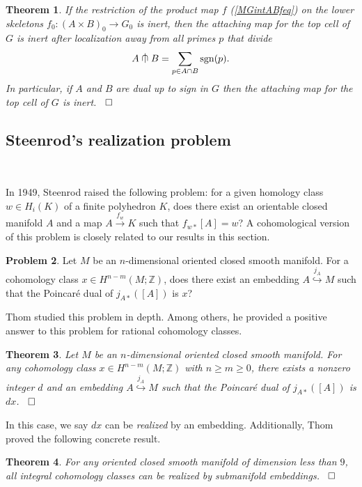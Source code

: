 \documentclass[a4]{amsart}
\newtheorem{theorem}{Theorem}[section]
\theoremstyle{definition}
\newtheorem{problem}[theorem]{Problem}
\newcommand{\testcap}{\mathrel{\vcenter{\offinterlineskip
\hbox{$\cap$}\vskip-1.8ex\hbox{$\kern0.2em | \kern0.15em$}}}}
\newcommand{\qqed}{\hfill\Box}
\begin{document}
\begin{sloppypar}
\begin{theorem}
If the restriction of the product map $f$ (\ref{MGintABfeq}) on the lower skeletons 
$
f_0: (A\times B)_0\stackrel{}{\longrightarrow} G_0
$ 
is inert, 
then the attaching map for the top cell of $G$ is inert after localization away from all primes $p$ that divide 
\[
A\testcap B=\sum\limits_{p\in A\cap B} {\rm sgn}(p).
\]
In particular, if $A$ and $B$ are dual up to sign in $G$ then the attaching map for the top cell of $G$ is inert.  ~$\qqed$
\end{theorem}
 

\subsection{Steenrod's realization problem}
\label{subsec: steenq}

$\, $

In 1949, Steenrod \cite{Eil49} raised the following problem: for a given homology class $w\in H_i(K)$ of a finite polyhedron $K$, does there exist an orientable closed manifold $A$ and a map $A\stackrel{f_w}{\longrightarrow} K$ such that $f_{w\ast}[A]=w$? A cohomological version of this problem is closely related to our results in this section. 
\begin{problem}\label{steenq}
Let $M$ be an $n$-dimensional oriented closed smooth manifold. For a cohomology class $x\in H^{n-m}(M;\mathbb{Z})$, does there exist an embedding $A\stackrel{j_A}{\hookrightarrow} M$ such that the Poincar\'{e} dual of $j_{A\ast}([A])$ is $x$? 
\end{problem}
Thom \cite{Tho54} studied this problem in depth. Among others, he provided a positive answer to this problem for rational cohomology classes.

\begin{theorem}\label{thomqthm}
Let $M$ be an $n$-dimensional oriented closed smooth manifold. 
For any cohomology class $x\in H^{n-m}(M;\mathbb{Z})$ with $n\geq m\geq 0$, there exists a nonzero integer $d$ and an embedding $A\stackrel{j_A}{\hookrightarrow} M$ such that the Poincar\'{e} dual of $j_{A\ast}([A])$ is $dx$.  ~$\qqed$
\end{theorem}
In this case, we say $dx$ can be {\it realized} by an embedding. Additionally, Thom proved the following concrete result.
\begin{theorem}\label{thom8thm}
For any oriented closed smooth manifold of dimension less than $9$, all integral cohomology classes can be realized by submanifold embeddings. ~$\qqed$
\end{theorem}


\end{sloppypar}
\end{document}
